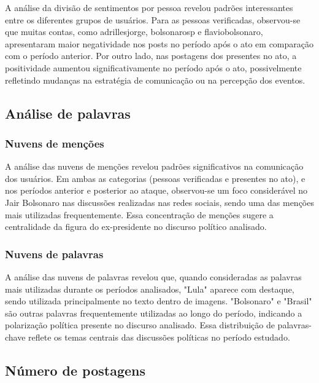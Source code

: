 \documentclass[manuscript,screen,review]{acmart}
\begin{document}
A análise da divisão de sentimentos por pessoa revelou padrões interessantes entre os diferentes grupos de usuários. Para as pessoas verificadas, observou-se que muitas contas, como adrillesjorge, bolsonarosp e flaviobolsonaro, apresentaram maior negatividade nos posts no período após o ato em comparação com o período anterior. Por outro lado, nas postagens dos presentes no ato, a positividade aumentou significativamente no período após o ato, possivelmente refletindo mudanças na estratégia de comunicação ou na percepção dos eventos.

\subsection{Análise de palavras}

\subsubsection{Nuvens de menções}

A análise das nuvens de menções revelou padrões significativos na comunicação dos usuários. Em ambas as categorias (pessoas verificadas e presentes no ato), e nos períodos anterior e posterior ao ataque, observou-se um foco considerável no Jair Bolsonaro nas discussões realizadas nas redes sociais, sendo uma das menções mais utilizadas frequentemente. Essa concentração de menções sugere a centralidade da figura do ex-presidente no discurso político analisado.

\subsubsection{Nuvens de palavras}

A análise das nuvens de palavras revelou que, quando consideradas as palavras mais utilizadas durante os períodos analisados, "Lula" aparece com destaque, sendo utilizada principalmente no texto dentro de imagens. "Bolsonaro" e "Brasil" são outras palavras frequentemente utilizadas ao longo do período, indicando a polarização política presente no discurso analisado. Essa distribuição de palavras-chave reflete os temas centrais das discussões políticas no período estudado.

\subsection{Número de postagens}
\end{document}

